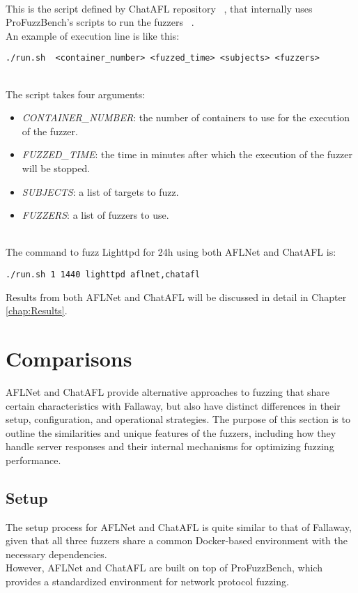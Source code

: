 \phantom{}\\
This is the script defined by ChatAFL repository ~\cite{chataflgithub}, that internally uses ProFuzzBench's scripts to run the fuzzers ~\cite{chataflgithubprofuz}.
\\An example of execution line is like this:\\
\begin{lstlisting}
./run.sh  <container_number> <fuzzed_time> <subjects> <fuzzers>
\end{lstlisting}
\phantom{}\\
The script takes four arguments:\\
\begin{itemize}
    \item \textit{CONTAINER\_NUMBER}: the number of containers to use for the execution of the fuzzer.
    \item \textit{FUZZED\_TIME}: the time in minutes after which the execution of the fuzzer will be stopped.
    \item \textit{SUBJECTS}: a list of targets to fuzz.
    \item \textit{FUZZERS}: a list of fuzzers to use.
\end{itemize}
\phantom{}\\
The command to fuzz Lighttpd for 24h using both AFLNet and ChatAFL is:
\begin{lstlisting}
./run.sh 1 1440 lighttpd aflnet,chatafl
\end{lstlisting}
Results from both AFLNet and ChatAFL will be discussed in detail in Chapter \ref{chap:Results}.

\section{Comparisons}

AFLNet and ChatAFL provide alternative approaches to fuzzing that share certain characteristics with Fallaway, but also have distinct differences in their setup, configuration, and operational strategies. The purpose of this section is to outline the similarities and unique features of the fuzzers, including how they handle server responses and their internal mechanisms for optimizing fuzzing performance.

\subsection{Setup}
The setup process for AFLNet and ChatAFL is quite similar to that of Fallaway, given that all three fuzzers share a common Docker-based environment with the necessary dependencies.
\\However, AFLNet and ChatAFL are built on top of ProFuzzBench, which provides a standardized environment for network protocol fuzzing.

